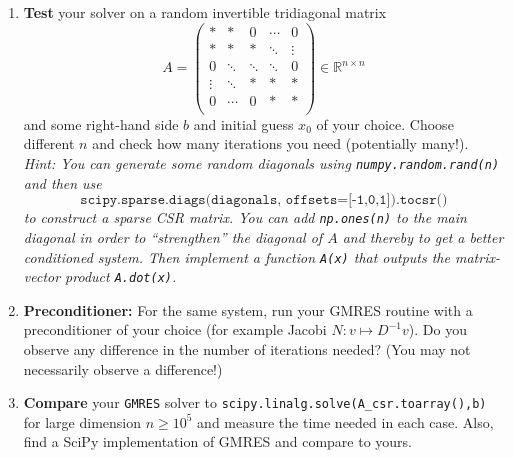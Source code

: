\begin{enumerate}
	\item \textbf{Test} your solver on a random invertible tridiagonal matrix 
	$$A = \begin{pmatrix}
	* & * 		& 0  &\cdots & 0\\
	* & *		& *  &\ddots &  \vdots\\
	0 & \ddots  		&\ddots   	 &\ddots  & 0 \\
	\vdots    & \ddots  		&*  	 &* & *\\
	0 & \cdots 	&  0  &* &*\\
	\end{pmatrix} \in \mathbb{R}^{n \times n}$$ 
	and some right-hand side $b$ and initial guess $x_0$ of your choice. Choose different $n$ and check how many iterations you need (potentially many!).\\
	\textit{Hint: You can generate some random diagonals using \texttt{numpy.random.rand(n)} and then use $$\texttt{scipy.sparse.diags(diagonals, offsets=[-1,0,1]).tocsr()}$$ to construct a sparse CSR matrix. You can add \texttt{np.ones(n)} to the main diagonal in order to ``strengthen'' the diagonal of $A$ and thereby to get a better conditioned system. Then implement a function \texttt{A(x)} that outputs the matrix-vector product \texttt{A.dot(x)}.} 
%
	\item \textbf{Preconditioner:} For the same system, run your GMRES routine with a preconditioner of your choice (for example Jacobi $N: v \mapsto D^{-1}v$). Do you observe any difference in the number of iterations needed? (You may not necessarily observe a difference!)
	\item \textbf{Compare} your \texttt{GMRES} solver to \texttt{scipy.linalg.solve(A\_csr.toarray(),b)} for large dimension $n \geq 10^{5}$ and measure the time needed in each case. Also, find a SciPy implementation of GMRES and compare to yours.
\end{enumerate}


